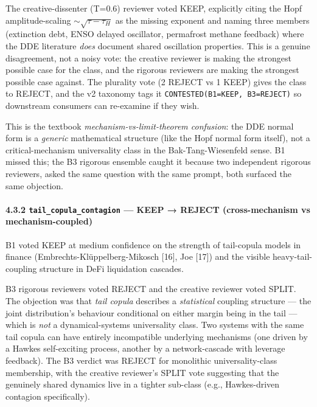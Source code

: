 \documentclass[
  letterpaper,
  11pt]{article}
\begin{document}
The creative-dissenter (T=0.6) reviewer voted KEEP, explicitly citing
the Hopf amplitude-scaling \(\sim\sqrt{\tau - \tau_H}\) as the missing
exponent and naming three members (extinction debt, ENSO delayed
oscillator, permafrost methane feedback) where the DDE literature
\emph{does} document shared oscillation properties. This is a genuine
disagreement, not a noisy vote: the creative reviewer is making the
strongest possible case for the class, and the rigorous reviewers are
making the strongest possible case against. The plurality vote (2 REJECT
vs 1 KEEP) gives the class to REJECT, and the v2 taxonomy tags it
\texttt{CONTESTED(B1=KEEP,\ B3=REJECT)} so downstream consumers can
re-examine if they wish.

This is the textbook \emph{mechanism-vs-limit-theorem confusion}: the
DDE normal form is a \emph{generic} mathematical structure (like the
Hopf normal form itself), not a critical-mechanism universality class in
the Bak-Tang-Wiesenfeld sense. B1 missed this; the B3 rigorous ensemble
caught it because two independent rigorous reviewers, asked the same
question with the same prompt, both surfaced the same objection.

\paragraph{\texorpdfstring{4.3.2 \texttt{tail\_copula\_contagion} ---
KEEP → REJECT (cross-mechanism vs
mechanism-coupled)}{4.3.2 tail\_copula\_contagion --- KEEP → REJECT (cross-mechanism vs mechanism-coupled)}}\label{tail_copula_contagion-keep-reject-cross-mechanism-vs-mechanism-coupled}

B1 voted KEEP at medium confidence on the strength of tail-copula models
in finance (Embrechts-Klüppelberg-Mikosch {[}16{]}, Joe {[}17{]}) and
the visible heavy-tail-coupling structure in DeFi liquidation cascades.

B3 rigorous reviewers voted REJECT and the creative reviewer voted
SPLIT. The objection was that \emph{tail copula} describes a
\emph{statistical} coupling structure --- the joint distribution's
behaviour conditional on either margin being in the tail --- which is
\emph{not} a dynamical-systems universality class. Two systems with the
same tail copula can have entirely incompatible underlying mechanisms
(one driven by a Hawkes self-exciting process, another by a
network-cascade with leverage feedback). The B3 verdict was REJECT for
monolithic universality-class membership, with the creative reviewer's
SPLIT vote suggesting that the genuinely shared dynamics live in a
tighter sub-class (e.g., Hawkes-driven contagion specifically).
\end{document}
